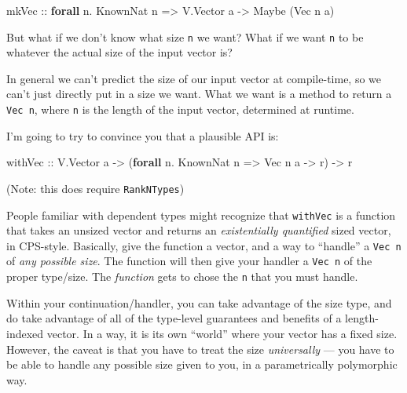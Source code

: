 \documentclass[]{article}
\newenvironment{Shaded}{}{}
\newcommand{\DataTypeTok}[1]{\textcolor[rgb]{0.56,0.13,0.00}{#1}}
\newcommand{\KeywordTok}[1]{\textcolor[rgb]{0.00,0.44,0.13}{\textbf{#1}}}
\newcommand{\NormalTok}[1]{#1}
\newcommand{\OperatorTok}[1]{\textcolor[rgb]{0.40,0.40,0.40}{#1}}
\newcommand{\OtherTok}[1]{\textcolor[rgb]{0.00,0.44,0.13}{#1}}
\begin{document}
\begin{Shaded}
\begin{Highlighting}[]
\OtherTok{mkVec ::} \KeywordTok{forall}\NormalTok{ n}\OperatorTok{.} \DataTypeTok{KnownNat}\NormalTok{ n }\OtherTok{=\textgreater{}} \DataTypeTok{V.Vector}\NormalTok{ a }\OtherTok{{-}\textgreater{}} \DataTypeTok{Maybe}\NormalTok{ (}\DataTypeTok{Vec}\NormalTok{ n a)}
\end{Highlighting}
\end{Shaded}

But what if we don't know what size \texttt{n} we want? What if we want
\texttt{n} to be whatever the actual size of the input vector is?

In general we can't predict the size of our input vector at compile-time, so we
can't just directly put in a size we want. What we want is a method to return a
\texttt{Vec\ n}, where \texttt{n} is the length of the input vector, determined
at runtime.

I'm going to try to convince you that a plausible API is:

\begin{Shaded}
\begin{Highlighting}[]
\NormalTok{withVec}
\OtherTok{    ::} \DataTypeTok{V.Vector}\NormalTok{ a}
    \OtherTok{{-}\textgreater{}}\NormalTok{ (}\KeywordTok{forall}\NormalTok{ n}\OperatorTok{.} \DataTypeTok{KnownNat}\NormalTok{ n }\OtherTok{=\textgreater{}} \DataTypeTok{Vec}\NormalTok{ n a }\OtherTok{{-}\textgreater{}}\NormalTok{ r)}
    \OtherTok{{-}\textgreater{}}\NormalTok{ r}
\end{Highlighting}
\end{Shaded}

(Note: this does require \texttt{RankNTypes})

People familiar with dependent types might recognize that \texttt{withVec} is a
function that takes an unsized vector and returns an \emph{existentially
quantified} sized vector, in CPS-style. Basically, give the function a vector,
and a way to ``handle'' a \texttt{Vec\ n} of \emph{any possible size}. The
function will then give your handler a \texttt{Vec\ n} of the proper type/size.
The \emph{function} gets to chose the \texttt{n} that you must handle.

Within your continuation/handler, you can take advantage of the size type, and
do take advantage of all of the type-level guarantees and benefits of a
length-indexed vector. In a way, it is its own ``world'' where your vector has a
fixed size. However, the caveat is that you have to treat the size
\emph{universally} --- you have to be able to handle any possible size given to
you, in a parametrically polymorphic way.
\end{document}
